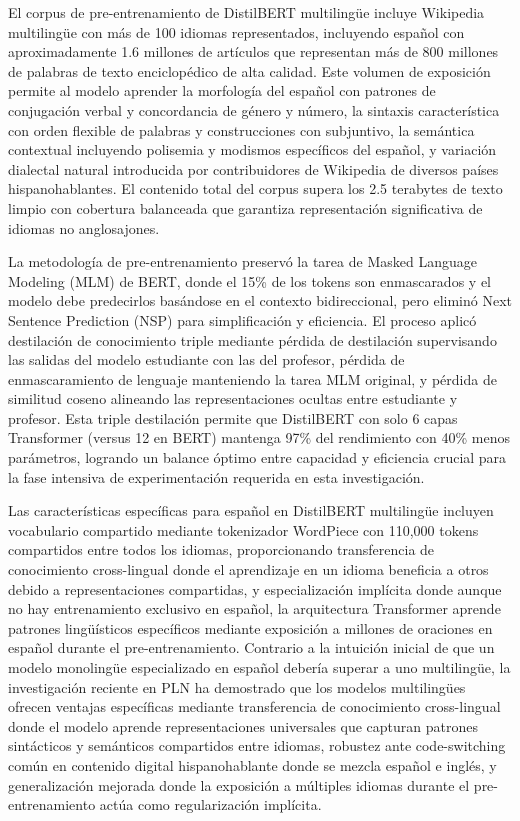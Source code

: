 El corpus de pre-entrenamiento de DistilBERT multilingüe incluye Wikipedia multilingüe con más de 100 idiomas representados, incluyendo español con aproximadamente 1.6 millones de artículos que representan más de 800 millones de palabras de texto enciclopédico de alta calidad. Este volumen de exposición permite al modelo aprender la morfología del español con patrones de conjugación verbal y concordancia de género y número, la sintaxis característica con orden flexible de palabras y construcciones con subjuntivo, la semántica contextual incluyendo polisemia y modismos específicos del español, y variación dialectal natural introducida por contribuidores de Wikipedia de diversos países hispanohablantes. El contenido total del corpus supera los 2.5 terabytes de texto limpio con cobertura balanceada que garantiza representación significativa de idiomas no anglosajones.

La metodología de pre-entrenamiento preservó la tarea de Masked Language Modeling (MLM) de BERT, donde el 15\% de los tokens son enmascarados y el modelo debe predecirlos basándose en el contexto bidireccional, pero eliminó Next Sentence Prediction (NSP) para simplificación y eficiencia. El proceso aplicó destilación de conocimiento triple mediante pérdida de destilación supervisando las salidas del modelo estudiante con las del profesor, pérdida de enmascaramiento de lenguaje manteniendo la tarea MLM original, y pérdida de similitud coseno alineando las representaciones ocultas entre estudiante y profesor. Esta triple destilación permite que DistilBERT con solo 6 capas Transformer (versus 12 en BERT) mantenga 97\% del rendimiento con 40\% menos parámetros, logrando un balance óptimo entre capacidad y eficiencia crucial para la fase intensiva de experimentación requerida en esta investigación.

Las características específicas para español en DistilBERT multilingüe incluyen vocabulario compartido mediante tokenizador WordPiece con 110,000 tokens compartidos entre todos los idiomas, proporcionando transferencia de conocimiento cross-lingual donde el aprendizaje en un idioma beneficia a otros debido a representaciones compartidas, y especialización implícita donde aunque no hay entrenamiento exclusivo en español, la arquitectura Transformer aprende patrones lingüísticos específicos mediante exposición a millones de oraciones en español durante el pre-entrenamiento. Contrario a la intuición inicial de que un modelo monolingüe especializado en español debería superar a uno multilingüe, la investigación reciente en PLN ha demostrado que los modelos multilingües ofrecen ventajas específicas mediante transferencia de conocimiento cross-lingual donde el modelo aprende representaciones universales que capturan patrones sintácticos y semánticos compartidos entre idiomas, robustez ante code-switching común en contenido digital hispanohablante donde se mezcla español e inglés, y generalización mejorada donde la exposición a múltiples idiomas durante el pre-entrenamiento actúa como regularización implícita.

